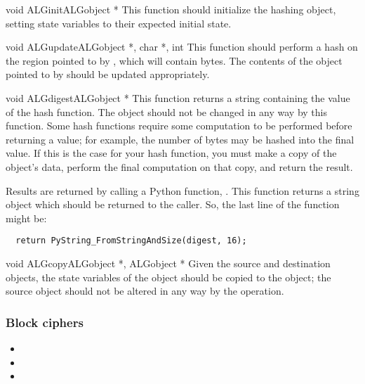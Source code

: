 \documentclass{howto}
\begin{document}
\begin{funcdesc}{void ALGinit}{\rm ALGobject *}
This function should initialize the hashing object, setting 
state variables to their expected initial state.
\end{funcdesc}

\begin{funcdesc}{void ALGupdate}{\rm ALGobject *, 
char *, int }
This function should perform a hash on the region pointed to by
, which will contain  bytes.  The contents of
the object pointed to by  should be updated appropriately. 
\end{funcdesc}

\begin{funcdesc}{void ALGdigest}{\rm ALGobject *}
This function returns a string containing the value of the hash
function.  The object should not be changed in any way by this
function.  Some hash functions require some computation to be
performed before returning a value; for example, the number of bytes
may be hashed into the final value.  If this is the case for your hash
function, you must make a copy of the object's data, perform the final
computation on that copy, and return the result.
\end{funcdesc}

Results are returned by calling a Python function,
.  This
function returns a string object which should be returned to the
caller.  So, the last line of the 
function might be:
\begin{verbatim}
  return PyString_FromStringAndSize(digest, 16);
\end{verbatim}

\begin{funcdesc}{void ALGcopy}{\rm ALGobject *, ALGobject *}
Given the source and destination objects, the state variables of the
 object should be copied to the  object; the
source object should not be altered in any way by the operation.
\end{funcdesc}

\subsubsection{Block ciphers}
\begin{itemize}
\item {}
\item {}
\item {}
\end{itemize}
\end{document}

